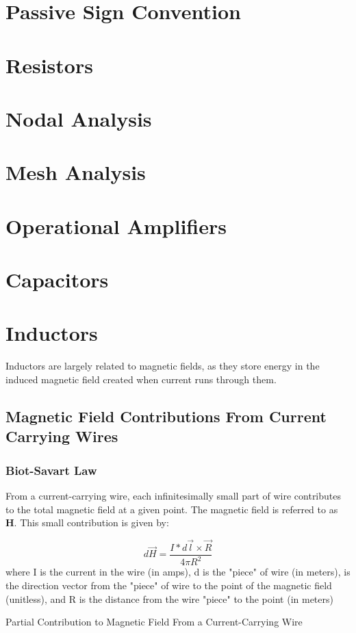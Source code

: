 \documentclass[12pt, letterpaper]{memoir}
\begin{document}
\chapter{Passive Sign Convention}

\chapter{Resistors}

\chapter{Nodal Analysis}

\chapter{Mesh Analysis}

\chapter{Operational Amplifiers}

\chapter{Capacitors}

\chapter{Inductors}
Inductors are largely related to magnetic fields, as they store energy in the induced magnetic field created when current runs through them.

\section{Magnetic Field Contributions From Current Carrying Wires}

\subsection{Biot-Savart Law}
From a current-carrying wire, each infinitesimally small part of wire contributes to the total magnetic field at a given point. The magnetic field is referred to as \textbf{H}. This small contribution is given by:
\begin{eqlisting} \label{magfield1}
	\begin{equation} 
	d\overrightarrow{H} = \frac{I*d\overrightarrow{l} \times \overrightarrow{R}}{4\pi R^2}
	\end{equation}
\tiny where I is the current in the wire (in amps), d is the "piece" of wire (in meters),  is the direction vector from the "piece" of wire to the point of the magnetic field (unitless), and R is the distance from the wire "piece" to the point (in meters)

\caption{\scriptsize Partial Contribution to Magnetic Field From a Current-Carrying Wire}
\end{eqlisting}
\end{document}
